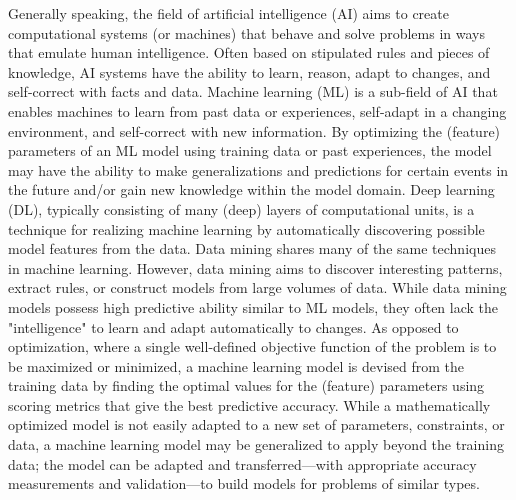 Generally speaking, the field of artificial intelligence (AI) aims to create computational systems (or machines) that behave and solve problems in ways that emulate human intelligence. Often based on stipulated rules and pieces of knowledge, AI systems have the ability to learn, reason, adapt to changes, and self-correct with facts and data. Machine learning (ML) is a sub-field of AI that enables machines to learn from past data or experiences, self-adapt in a changing environment, and self-correct with new information. By optimizing the (feature) parameters of an ML model using training data or past experiences, the model may have the ability to make generalizations and predictions for certain events in the future and/or gain new knowledge within the model domain. Deep learning (DL), typically consisting of many (deep) layers of computational units, is a technique for realizing machine learning by automatically discovering possible model features from the data. Data mining shares many of the same techniques in machine learning. However, data mining aims to discover interesting patterns, extract rules, or construct models from large volumes of data. While data mining models possess high predictive ability similar to ML models, they often lack the "intelligence" to learn and adapt automatically to changes. As opposed to optimization, where a single well-defined objective function of the problem is to be maximized or minimized, a machine learning model is devised from the training data by finding the optimal values for the (feature) parameters using scoring metrics that give the best predictive accuracy. While a mathematically optimized model is not easily adapted to a new set of parameters, constraints, or data, a machine learning model may be generalized to apply beyond the training data; the model can be adapted and transferred—with appropriate accuracy measurements and validation—to build models for problems of similar types. 

